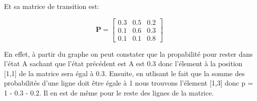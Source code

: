 \begin{Exercice}[5 minutes]
\begin{solution}
	Et sa matrice de transition est:

	\[ 
		\mathbf{P} =
		\begin{bmatrix}
		0.3 & 0.5 & 0.2 \\
		0.1 & 0.6 & 0.3 \\
		0.1 & 0.1 & 0.8
		\end{bmatrix}
	\]

    En effet, à partir du graphe on peut constater que la propabilité pour rester dans l'état A sachant que l'état précédent est A
    est 0.3 donc l'élement à la position [1,1] de la matrice sera égal à 0.3. Ensuite, en utlisant le fait que la somme des probabilités d'une ligne doit 
    être égale à 1 nous trouvons l'élement [1,3] donc p = 1 - 0.3 - 0.2. 
    Il en est de même pour le reste des lignes de la matrice.
	
    \end{solution}
\end{Exercice}

